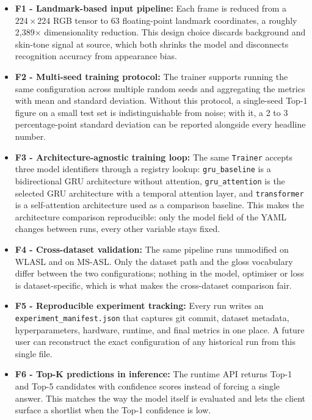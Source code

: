 \begin{itemize}
    \item \textbf{F1 - Landmark-based input pipeline:} Each frame is reduced from a $224 \times 224$ RGB tensor to 63 floating-point landmark coordinates, a roughly 2{,}389$\times$ dimensionality reduction. This design choice discards background and skin-tone signal at source, which both shrinks the model and disconnects recognition accuracy from appearance bias.
    \item \textbf{F2 - Multi-seed training protocol:} The trainer supports running the same configuration across multiple random seeds and aggregating the metrics with mean and standard deviation. Without this protocol, a single-seed Top-1 figure on a small test set is indistinguishable from noise; with it, a 2 to 3 percentage-point standard deviation can be reported alongside every headline number.
    \item \textbf{F3 - Architecture-agnostic training loop:} The same \texttt{Trainer} accepts three model identifiers through a registry lookup: \texttt{gru\_baseline} is a bidirectional GRU architecture without attention, \texttt{gru\_attention} is the selected GRU architecture with a temporal attention layer, and \texttt{transformer} is a self-attention architecture used as a comparison baseline. This makes the architecture comparison reproducible: only the model field of the YAML changes between runs, every other variable stays fixed.
    \item \textbf{F4 - Cross-dataset validation:} The same pipeline runs unmodified on WLASL and on MS-ASL. Only the dataset path and the gloss vocabulary differ between the two configurations; nothing in the model, optimiser or loss is dataset-specific, which is what makes the cross-dataset comparison fair.
    \item \textbf{F5 - Reproducible experiment tracking:} Every run writes an \texttt{experiment\_manifest.json} that captures git commit, dataset metadata, hyperparameters, hardware, runtime, and final metrics in one place. A future user can reconstruct the exact configuration of any historical run from this single file.
    \item \textbf{F6 - Top-K predictions in inference:} The runtime API returns Top-1 and Top-5 candidates with confidence scores instead of forcing a single answer. This matches the way the model itself is evaluated and lets the client surface a shortlist when the Top-1 confidence is low.
\end{itemize}

